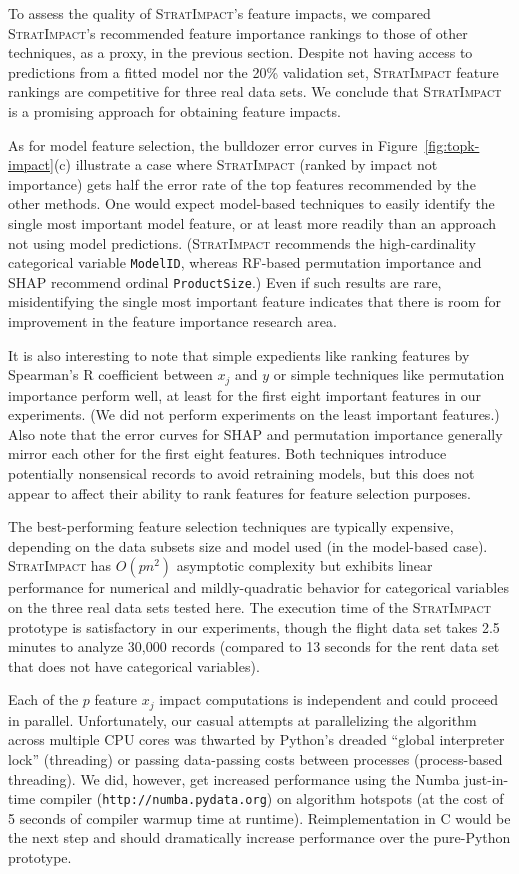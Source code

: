 \documentclass[11pt]{article}
\newcommand{\figref}[1]{Figure~\ref{#1}}
\newcommand{\simp}{\fontfamily{cmr}\textsc{\small StratImpact}}
\begin{document}
To assess the quality of \simp's feature impacts, we compared \simp's recommended feature importance rankings to those of other techniques, as a proxy, in the previous section. Despite not having access to predictions from a fitted model nor the 20\% validation set, \simp{} feature rankings are competitive for three real data sets. We conclude that \simp{} is a promising approach for obtaining feature impacts.  

As for model feature selection, the bulldozer error curves in \figref{fig:topk-impact}(c) illustrate a case where \simp{} (ranked by impact not importance) gets half the error rate of the top features recommended by the other methods.  One would expect model-based techniques to easily identify the single most important model feature, or at least more readily than an approach not using model predictions.  (\simp{} recommends the high-cardinality categorical variable {\tt ModelID}, whereas RF-based permutation importance and SHAP recommend ordinal {\tt ProductSize}.)  Even if such results are rare, misidentifying the single most important feature indicates that there is room for improvement in the feature importance research area. 

It is also interesting to note that simple expedients like ranking features by Spearman's R coefficient between $x_j$ and $y$ or simple techniques like permutation importance perform well, at least for the first eight important features in our experiments. (We did not perform experiments on the least important features.) Also note that the error curves for SHAP and permutation importance generally mirror each other for the first eight features.  Both techniques introduce potentially nonsensical records to avoid retraining models, but this does not appear to affect their ability to rank features for feature selection purposes.

The best-performing feature selection techniques are typically expensive, depending on the data subsets size and model used (in the model-based case).  \simp{} has $O(pn^2)$ asymptotic complexity but exhibits linear performance for numerical and mildly-quadratic behavior for categorical variables on the three real data sets tested here.  The execution time of the \simp{} prototype is satisfactory in our experiments, though the flight data set takes 2.5 minutes to analyze 30,000 records (compared to 13 seconds for the rent data set that does not have categorical variables).

Each of the $p$ feature $x_j$ impact computations is independent and could proceed in parallel. Unfortunately, our casual attempts at parallelizing the algorithm across multiple CPU cores was thwarted by Python's dreaded ``global interpreter lock'' (threading) or passing data-passing costs between processes (process-based threading).  We did, however, get increased performance using the Numba just-in-time compiler ({\tt\small http://numba.pydata.org}) on algorithm hotspots (at the cost of 5 seconds of compiler warmup time at runtime). Reimplementation in C would be the next step and should dramatically increase performance over the pure-Python prototype.
\end{document}
